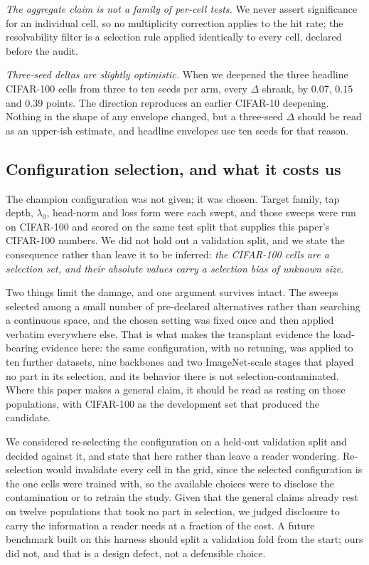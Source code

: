 \emph{The aggregate claim is not a family of per-cell tests.} We never
assert significance for an individual cell, so no multiplicity correction
applies to the hit rate; the resolvability filter is a selection rule
applied identically to every cell, declared before the audit.

\emph{Three-seed deltas are slightly optimistic.} When we deepened the
three headline CIFAR-100 cells from three to ten seeds per arm, every
$\Delta$ shrank, by $0.07$, $0.15$ and $0.39$ points. The direction
reproduces an earlier CIFAR-10 deepening. Nothing in the shape of any
envelope changed, but a three-seed $\Delta$ should be read as an
upper-ish estimate, and headline envelopes use ten seeds for that reason.

\subsection{Configuration selection, and what it costs us}\label{sec:selection}
The champion configuration was not given; it was chosen. Target family,
tap depth, $\lambda_0$, head-norm and loss form were each swept, and those
sweeps were run on CIFAR-100 and scored on the same test split that
supplies this paper's CIFAR-100 numbers. We did not hold out a validation
split, and we state the consequence rather than leave it to be inferred:
\emph{the CIFAR-100 cells are a selection set, and their absolute values
carry a selection bias of unknown size.}

Two things limit the damage, and one argument survives intact. The sweeps
selected among a small number of pre-declared alternatives rather than
searching a continuous space, and the chosen setting was fixed once and
then applied verbatim everywhere else. That is what makes the transplant
evidence the load-bearing evidence here: the same configuration, with no
retuning, was applied to ten further datasets, nine backbones and two
ImageNet-scale stages that played no part in its selection, and its
behavior there is not selection-contaminated. Where this paper makes a
general claim, it should be read as resting on those populations, with
CIFAR-100 as the development set that produced the candidate.

We considered re-selecting the configuration on a held-out validation
split and decided against it, and state that here rather than leave a
reader wondering. Re-selection would invalidate every cell in the grid,
since the selected configuration is the one \computeCells{} cells were trained
with, so the available choices were to disclose the contamination or to
retrain the study. Given that the general claims already rest on twelve
populations that took no part in selection, we judged disclosure to carry
the information a reader needs at a fraction of the cost. A future
benchmark built on this harness should split a validation fold from the
start; ours did not, and that is a design defect, not a defensible choice.


